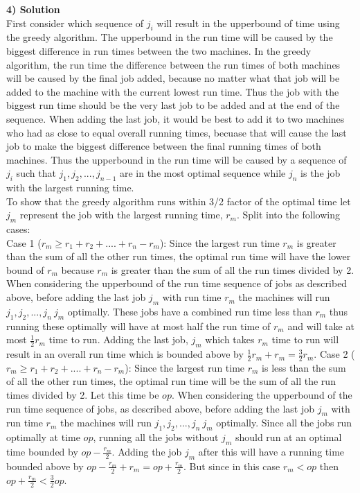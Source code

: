 \documentclass[11pt]{article}
\begin{document}
\textbf{4) Solution}\\
First consider which sequence of $j_i$ will result in the upperbound of time using the greedy algorithm. The upperbound in the run time will be caused by the biggest difference in run times between the two machines. In the greedy algorithm, the run time the difference between the run times of both machines will be caused by the final job added, because no matter what that job will be added to the machine with the current lowest run time. Thus the job with the biggest run time should be the very last job to be added and at the end of the sequence. When adding the last job, it would be best to add it to two machines who had as close to equal overall running times, becuase that will cause the last job to make the biggest difference between the final running times of both machines. Thus the upperbound in the run time will be caused by a sequence of $j_i$ such that $j_1, j_2, ..., j_{n-1}$ are in the most optimal sequence while $j_n$ is the job with the largest running time.\\
To show that the greedy algorithm runs within 3/2 factor of the optimal time let $j_m$ represent the job with the largest running time, $r_m$. Split into the following cases:\\
Case 1 ($r_m \geq r_1+r_2+....+r_n - r_m$): Since the largest run time $r_m$ is greater than the sum of all the other run times, the optimal run time will have the lower bound of $r_m$ because $r_m$ is greater than the sum of all the run times divided by 2. When considering the upperbound of the run time sequence of jobs as described above, before adding the last job $j_m$ with run time $r_m$ the machines will run $j_1, j_2, ..., j_n \ j_m$ optimally. These jobs have a combined run time less than $r_m$ thus running these optimally will have at most half the run time of $r_m$ and will take at most $\frac{1}{2} r_m$ time to run. Adding the last job, $j_m$ which takes $r_m$ time to run will result in an overall run time which is bounded above by $\frac{1}{2}r_m + r_m = \frac{3}{2}r_m$.
Case 2 ($r_m \geq r_1+r_2+....+r_n - r_m$): Since the largest run time $r_m$ is less than the sum of all the other run times, the optimal run time will be the sum of all the run times divided by 2. Let this time be $op$. When considering the upperbound of the run time sequence of jobs, as described above, before adding the last job $j_m$ with run time $r_m$ the machines will run $j_1, j_2, ..., j_n \ j_m$ optimally. Since all the jobs run optimally at time $op$, running all the jobs without $j_m$ should run at an optimal time bounded by $op - \frac{r_m}{2}$. Adding the job $j_m$ after this will have a running time bounded above by $op - \frac{r_m}{2} + r_m = op + \frac{r_m}{2}$. But since in this case $r_m < op$ then $op + \frac{r_m}{2} < 	\frac{3}{2}op$. \\
\end{document}
